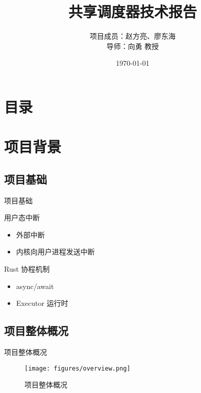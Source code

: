 \documentclass{beamer}
\title[共享调度器技术报告]{共享调度器技术报告}
\author[赵方亮、廖东海]{项目成员：赵方亮、廖东海\\[5mm] 导师：向勇 教授}
\institute[清华大学]{\small  清华大学}
\date{\small \vskip -10pt \today}
\begin{document}
\begin{frame}
	\maketitle
\end{frame}

\section*{目录}
\frame{
  \frametitle{\secname}
  \tableofcontents[hideallsubsections]
}

\section{项目背景}

\subsection{项目基础}

\begin{frame}{项目基础}
  \begin{block}{用户态中断\cite{gallium70}}
    \begin{itemize}
      \item 外部中断
      \item 内核向用户进程发送中断
    \end{itemize}
  \end{block}
  \begin{block}{Rust 协程机制\cite{stevenbai}}
    \begin{itemize}
      \item async/await
      \item Executor 运行时
    \end{itemize}
  \end{block}
\end{frame}

\subsection{项目整体概况}

\begin{frame}{项目整体概况}
  \begin{figure}
    \texttt{[image: figures/overview.png]}
    \caption{项目整体概况}
  \end{figure}
\end{frame}
\end{document}
